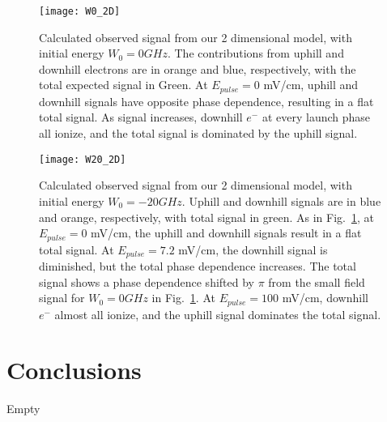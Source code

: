 \documentclass[aps,pra,preprint,groupedaddress]{revtex4-1}
\begin{document}
\begin{figure}
	\texttt{[image: W0\_2D]}
	\caption{Calculated observed signal from our 2 dimensional model, with initial energy $W_0 = 0 GHz$. The contributions from uphill and downhill electrons are in orange and blue, respectively, with the total expected signal in Green. At $E_{pulse} = 0$ mV/cm, uphill and downhill signals have opposite phase dependence, resulting in a flat total signal. As signal increases, downhill $e^-$ at every launch phase all ionize, and the total signal is dominated by the uphill signal.}
	\label{fig:2DW0}
\end{figure}

\begin{figure}
	\texttt{[image: W20\_2D]}
	\caption{Calculated observed signal from our 2 dimensional model, with initial energy $W_0 = -20 GHz$. Uphill and downhill signals are in blue and orange, respectively, with total signal in green. As in Fig.~\ref{fig:2DW0}, at $E_{pulse} = 0$ mV/cm, the uphill and downhill signals result in a flat total signal. At $E_{pulse} = 7.2$ mV/cm, the downhill signal is diminished, but the total phase dependence increases. The total signal shows a phase dependence shifted by $\pi$ from the small field signal for $W_0 = 0 GHz$ in Fig.~\ref{fig:2DW0}. At $E_{pulse} = 100$ mV/cm, downhill $e^-$ almost all ionize, and the uphill signal dominates the total signal.}
	\label{fig:2DW20}
\end{figure}

\section{\label{sec:conc} Conclusions}

Empty
\end{document}
